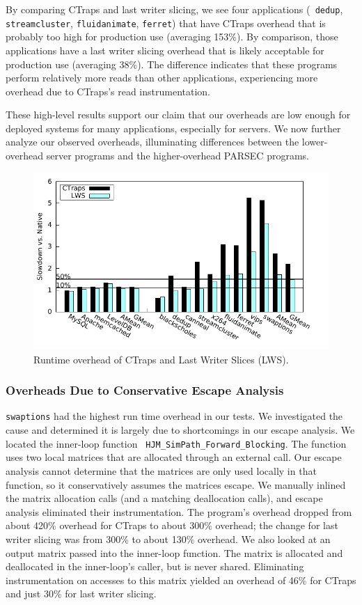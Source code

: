 \documentclass[preprint,9pt]{sigplanconf}
\newcommand{\ctraps}{CTraps\xspace}
\begin{document}
By comparing \ctraps and last writer slicing, we see four applications ({\tt
dedup}, {\tt streamcluster}, {\tt fluidanimate}, {\tt ferret}) that have
\ctraps overhead that is probably too high for production use (averaging
153\%).  By comparison, those applications have a last writer slicing overhead
that is likely acceptable for production use (averaging 38\%).  The difference
indicates that these programs perform relatively more reads than other
applications, experiencing more overhead due to \ctraps's read instrumentation.

These high-level results support our claim that our overheads 
are low enough for deployed systems for many applications, especially
for servers.  We now further analyze our observed overheads, illuminating
differences between the lower-overhead server programs and the higher-overhead
PARSEC programs.

\begin{figure}
\centering
\includegraphics[width=.9\columnwidth]{plots/perf.pdf}
\caption{\label{fig:perfall}Runtime overhead of \ctraps and Last Writer Slices (LWS).}
\end{figure}

\subsubsection{Overheads Due to Conservative Escape Analysis}
\label{sec:eval:conservative}
{\tt swaptions} had the highest run time overhead in our tests.  We
investigated the cause and determined it is largely due to shortcomings in our
escape analysis.  We located the inner-loop function {\tt
HJM\_SimPath\_Forward\_Blocking}.  The function uses two local matrices that
are allocated through an external call.  Our escape analysis cannot determine
that the matrices are only used locally in that function, so it conservatively
assumes the matrices escape.  We manually inlined the matrix allocation calls
(and a matching deallocation calls), and escape analysis eliminated their
instrumentation.  The program's overhead dropped from about 420\% overhead for
\ctraps to about 300\% overhead; the change for last writer slicing was from
300\% to about 130\% overhead.  We also looked at an output matrix passed into
the inner-loop function.  The matrix is allocated and deallocated in the
inner-loop's caller, but is never shared.  Eliminating instrumentation on
accesses to this matrix yielded an overhead of 46\% for \ctraps and 
just 30\% for last writer slicing.  
\end{document}
